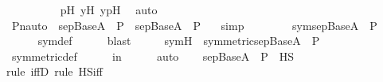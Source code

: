 \begin{isabellebody}
\ \ \ \ \ \ \ \ \isamarkupfalse%
\ p{\isacharprime}{\kern0pt}H\ y{\isacharprime}{\kern0pt}H\ ypH\ \isamarkupfalse%
\ auto\isanewline
\ \ \ \ \isamarkupfalse%
\isanewline
\isanewline
\ \ \ \ \isamarkupfalse%
\ \isamarkupfalse%
\ {\isachardoublequoteopen}Pn{\isacharunderscore}{\kern0pt}auto{\isacharparenleft}{\kern0pt}{\isasympi}{\isacharparenright}{\kern0pt}\ {\isacharbackquote}{\kern0pt}\ {\isacharparenleft}{\kern0pt}sep{\isacharunderscore}{\kern0pt}Base{\isacharparenleft}{\kern0pt}A{\isacharparenright}{\kern0pt}\ {\isasymtimes}\ P{\isacharparenright}{\kern0pt}\ {\isacharequal}{\kern0pt}\ sep{\isacharunderscore}{\kern0pt}Base{\isacharparenleft}{\kern0pt}A{\isacharparenright}{\kern0pt}\ {\isasymtimes}\ P\ {\isachardoublequoteclose}\ \isamarkupfalse%
\ simp\isanewline
\ \ \isamarkupfalse%
\isanewline
\isanewline
\ \ \isamarkupfalse%
\ \isamarkupfalse%
\ {\isachardoublequoteopen}sym{\isacharparenleft}{\kern0pt}sep{\isacharunderscore}{\kern0pt}Base{\isacharparenleft}{\kern0pt}A{\isacharparenright}{\kern0pt}\ {\isasymtimes}\ P{\isacharparenright}{\kern0pt}\ {\isacharequal}{\kern0pt}\ {\isasymG}{\isachardoublequoteclose}\ \isanewline
\ \ \ \ \isamarkupfalse%
\ sym{\isacharunderscore}{\kern0pt}def\isanewline
\ \ \ \ \isamarkupfalse%
\ blast\isanewline
\isanewline
\ \ \isamarkupfalse%
\ \isamarkupfalse%
\ symH\ {\isacharcolon}{\kern0pt}\ {\isachardoublequoteopen}symmetric{\isacharparenleft}{\kern0pt}sep{\isacharunderscore}{\kern0pt}Base{\isacharparenleft}{\kern0pt}A{\isacharparenright}{\kern0pt}\ {\isasymtimes}\ P{\isacharparenright}{\kern0pt}{\isachardoublequoteclose}\ \isanewline
\ \ \ \ \isamarkupfalse%
\ symmetric{\isacharunderscore}{\kern0pt}def\isanewline
\ \ \ \ \isamarkupfalse%
\ {\isasymG}{\isacharunderscore}{\kern0pt}in{\isacharunderscore}{\kern0pt}{\isasymF}\isanewline
\ \ \ \ \isamarkupfalse%
\ auto\isanewline
\isanewline
\ \ \isamarkupfalse%
\ {\isachardoublequoteopen}sep{\isacharunderscore}{\kern0pt}Base{\isacharparenleft}{\kern0pt}A{\isacharparenright}{\kern0pt}\ {\isasymtimes}\ P\ {\isasymin}\ HS{\isachardoublequoteclose}\ \isanewline
\ \ \ \ \isamarkupfalse%
{\isacharparenleft}{\kern0pt}rule\ iffD{}{\isacharcomma}{\kern0pt}\ rule\ HS{\isacharunderscore}{\kern0pt}iff{\isacharparenright}{\kern0pt}\isanewline
\ \ \ \ \isamarkupfalse%

\end{isabellebody}
